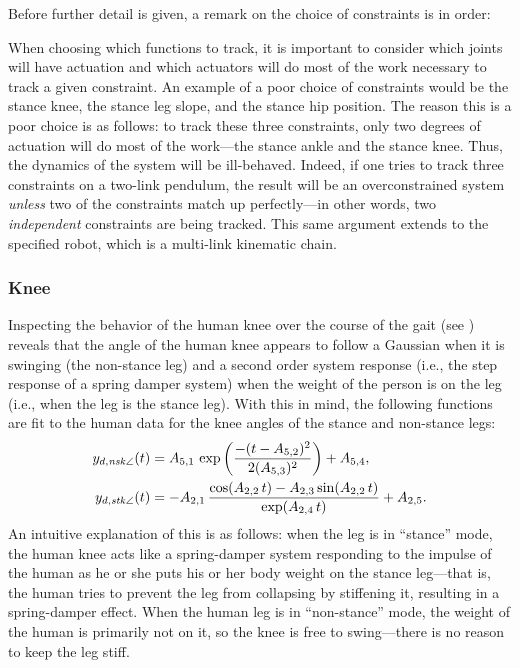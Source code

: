 Before further detail is given, a remark on the choice of constraints is in order:
\begin{remark} \label{rmk:actuation}
  When choosing which functions to track, it is important to consider which
  joints will have actuation and which actuators will do most of the work
  necessary to track a given constraint.
  An example of a poor choice of constraints would be the stance knee, the
  stance leg slope, and the stance hip position.
  The reason this is a poor choice is as follows:
  to track these three constraints, only two degrees of actuation will do most
  of the work---the stance ankle and the stance knee.
  Thus, the dynamics of the system will be ill-behaved.
  Indeed, if one tries to track three constraints on a two-link pendulum, the
  result will be an overconstrained system {\em unless} two of the constraints
  match up perfectly---in other words, two {\em independent} constraints are
  being tracked.
  This same argument extends to the specified robot, which is a multi-link
  kinematic chain.
\end{remark}

\subsubsection{Knee} Inspecting the behavior of the human knee over the course of the gait (see ) reveals that the angle of the human knee appears to follow a Gaussian when it is swinging (the non-stance leg) and a second order system response (i.e., the step response of a spring damper system) when the weight of the person is on the leg (i.e., when the leg is the stance leg). With this in mind, the following functions are fit to the human data for the knee angles of the stance and non-stance legs:
\begin{align*}
  y_{d,\mathit{nsk}\angle}(t) &= A_{5,1} \, \exp\left(\frac{-(t-A_{5,2})^2}{2 (A_{5,3})^2}\right) + A_{5,4},\\
  y_{d,\mathit{stk}\angle}(t) &= -A_{2,1} \, \frac{\cos(A_{2,2}\,t)-A_{2,3} \sin(A_{2,2}\,t)}{\exp(A_{2,4} \, t)} + A_{2,5}.
\end{align*}
An intuitive explanation of this is as follows: when the leg is in ``stance'' mode, the human knee acts like a spring-damper system responding to the impulse of the human as he or she puts his or her body weight on the stance leg---that is, the human tries to prevent the leg from collapsing by stiffening it, resulting in a spring-damper effect. When the human leg is in ``non-stance'' mode, the weight of the human is primarily not on it, so the knee is free to swing---there is no reason to keep the leg stiff.

